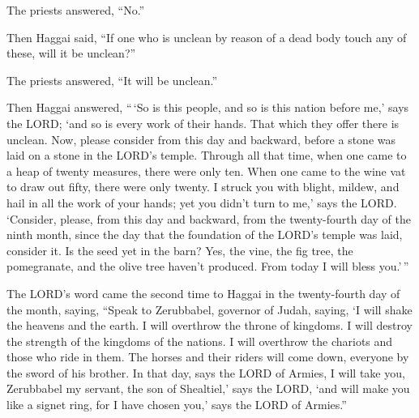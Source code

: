 The priests answered, ``No.''

 Then Haggai said, ``If one who is unclean by reason of a
dead body touch any of these, will it be unclean?''

The priests answered, ``It will be unclean.''

 Then Haggai answered, ``\,`So is this people, and so is
this nation before me,' says the LORD; `and so is every work of their
hands. That which they offer there is unclean.  Now, please
consider from this day and backward, before a stone was laid on a stone
in the LORD's temple.  Through all that time, when one came
to a heap of twenty measures, there were only ten. When one came to the
wine vat to draw out fifty, there were only twenty.  I
struck you with blight, mildew, and hail in all the work of your hands;
yet you didn't turn to me,' says the LORD.  `Consider,
please, from this day and backward, from the twenty-fourth day of the
ninth month, since the day that the foundation of the LORD's temple was
laid, consider it.  Is the seed yet in the barn? Yes, the
vine, the fig tree, the pomegranate, and the olive tree haven't
produced. From today I will bless you.'\,''

 The LORD's word came the second time to Haggai in the
twenty-fourth day of the month, saying,  ``Speak to
Zerubbabel, governor of Judah, saying, `I will shake the heavens and the
earth.  I will overthrow the throne of kingdoms. I will
destroy the strength of the kingdoms of the nations. I will overthrow
the chariots and those who ride in them. The horses and their riders
will come down, everyone by the sword of his brother.  In
that day, says the LORD of Armies, I will take you, Zerubbabel my
servant, the son of Shealtiel,' says the LORD, `and will make you like a
signet ring, for I have chosen you,' says the LORD of Armies.''
